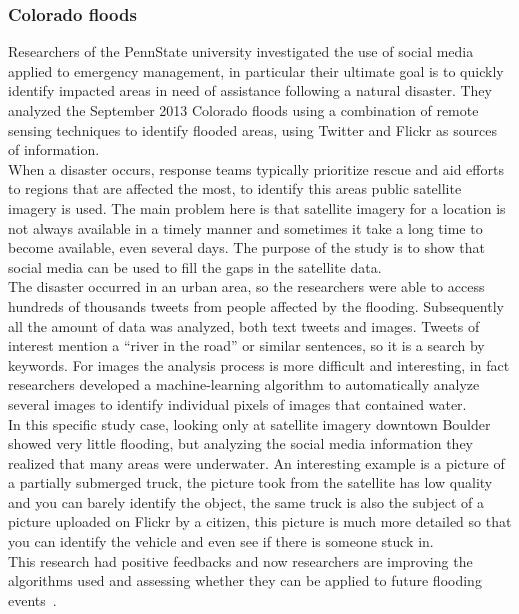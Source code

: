 \subsubsection{Colorado floods}
\noindent Researchers of the PennState university investigated the use of social media applied to emergency management, in particular their ultimate goal is to quickly identify impacted areas in need of assistance following a natural disaster. They analyzed the September 2013 Colorado floods using a combination of remote sensing techniques to identify flooded areas, using Twitter and Flickr as sources of information.
\\
\noindent When a disaster occurs, response teams typically prioritize rescue and aid efforts to regions that are affected the most, to identify this areas public satellite imagery is used. The main problem here is that satellite imagery for a location is not always available in a timely manner and sometimes it take a long time to become available, even several days. The purpose of the study is to show that social media can be used to fill the gaps in the satellite data.
\\
\noindent The disaster occurred in an urban area, so the researchers were able to access hundreds of thousands tweets from people affected by the flooding.
Subsequently all the amount of data was analyzed, both text tweets and images. Tweets of interest mention a ``river in the road'' or similar sentences, so it is a search by keywords. For images the analysis process is more difficult and interesting, in fact researchers developed a machine-learning algorithm to automatically analyze several images to identify individual pixels of images that contained water.
\\
\noindent In this specific study case, looking only at satellite imagery downtown Boulder showed very little flooding, but analyzing the social media information they realized that many areas were underwater. An interesting example is a picture of a partially submerged truck, the picture took from the satellite has low quality and you can barely identify the object, the same truck is also the subject of a picture uploaded on Flickr by a citizen, this picture is much more detailed so that you can identify the vehicle and even see if there is someone stuck in.
\\
\noindent This research had positive feedbacks and now researchers are improving the algorithms used and assessing whether they can be applied to future flooding events~\cite{pennstate}.

